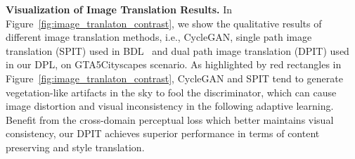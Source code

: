 \documentclass[10pt,twocolumn,letterpaper]{article}
\begin{document}
{\noindent \textbf{Visualization of Image Translation Results.}}\hspace{3pt}
In Figure~\ref{fig:image_tranlaton_contrast}, we show the qualitative results of different image translation methods, i.e., CycleGAN, single path image translation (SPIT) used in BDL~\cite{li2019bidirectional} and dual path image translation (DPIT) used in our DPL, on GTA5Cityscapes scenario. As highlighted by red rectangles in Figure~\ref{fig:image_tranlaton_contrast}, CycleGAN and SPIT tend to generate vegetation-like artifacts in the sky to fool the discriminator, which can cause image distortion and visual inconsistency in the following adaptive learning. Benefit from the cross-domain perceptual loss which better maintains visual consistency, our DPIT achieves superior performance in terms of content preserving and style translation.
\end{document}
